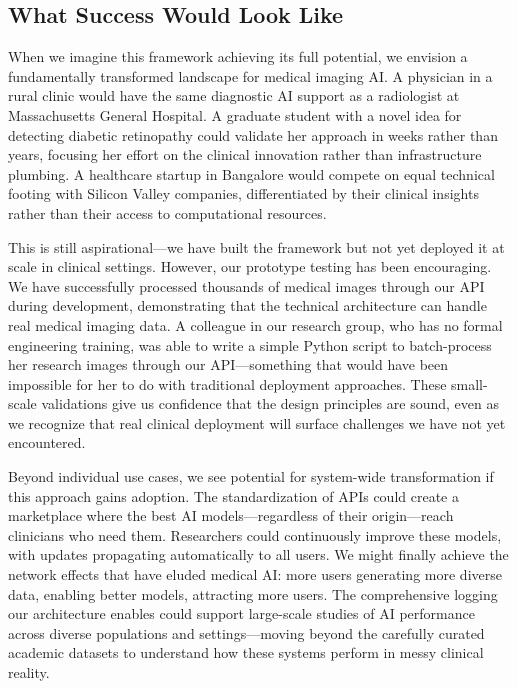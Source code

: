 \documentclass[12pt,a4paper]{article}
\begin{document}
\subsection{What Success Would Look Like}

When we imagine this framework achieving its full potential, we envision a fundamentally transformed landscape for medical imaging AI. A physician in a rural clinic would have the same diagnostic AI support as a radiologist at Massachusetts General Hospital. A graduate student with a novel idea for detecting diabetic retinopathy could validate her approach in weeks rather than years, focusing her effort on the clinical innovation rather than infrastructure plumbing. A healthcare startup in Bangalore would compete on equal technical footing with Silicon Valley companies, differentiated by their clinical insights rather than their access to computational resources.

This is still aspirational—we have built the framework but not yet deployed it at scale in clinical settings. However, our prototype testing has been encouraging. We have successfully processed thousands of medical images through our API during development, demonstrating that the technical architecture can handle real medical imaging data. A colleague in our research group, who has no formal engineering training, was able to write a simple Python script to batch-process her research images through our API—something that would have been impossible for her to do with traditional deployment approaches. These small-scale validations give us confidence that the design principles are sound, even as we recognize that real clinical deployment will surface challenges we have not yet encountered.

Beyond individual use cases, we see potential for system-wide transformation if this approach gains adoption. The standardization of APIs could create a marketplace where the best AI models—regardless of their origin—reach clinicians who need them. Researchers could continuously improve these models, with updates propagating automatically to all users. We might finally achieve the network effects that have eluded medical AI: more users generating more diverse data, enabling better models, attracting more users. The comprehensive logging our architecture enables could support large-scale studies of AI performance across diverse populations and settings—moving beyond the carefully curated academic datasets to understand how these systems perform in messy clinical reality.
\end{document}
